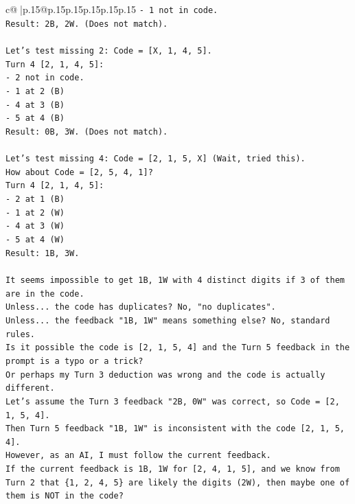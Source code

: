 \documentclass{article}
\begin{document}
{\begin{supertabular}{c@{$\;$}|p{.15\linewidth}@{}p{.15\linewidth}p{.15\linewidth}p{.15\linewidth}p{.15\linewidth}p{.15\linewidth}}
{{{\texttt{{-} 1 not in code.} \\
\texttt{Result: 2B, 2W. (Does not match).} \\
\\ 
\texttt{Let's test missing 2: Code = {[}X, 1, 4, 5{]}.} \\
\texttt{Turn 4 {[}2, 1, 4, 5{]}:} \\
\texttt{{-} 2 not in code.} \\
\texttt{{-} 1 at 2 (B)} \\
\texttt{{-} 4 at 3 (B)} \\
\texttt{{-} 5 at 4 (B)} \\
\texttt{Result: 0B, 3W. (Does not match).} \\
\\ 
\texttt{Let's test missing 4: Code = {[}2, 1, 5, X{]} (Wait, tried this).} \\
\texttt{How about Code = {[}2, 5, 4, 1{]}?} \\
\texttt{Turn 4 {[}2, 1, 4, 5{]}:} \\
\texttt{{-} 2 at 1 (B)} \\
\texttt{{-} 1 at 2 (W)} \\
\texttt{{-} 4 at 3 (W)} \\
\texttt{{-} 5 at 4 (W)} \\
\texttt{Result: 1B, 3W.} \\
\\ 
\texttt{It seems impossible to get 1B, 1W with 4 distinct digits if 3 of them are in the code.} \\
\texttt{Unless... the code has duplicates? No, "no duplicates".} \\
\texttt{Unless... the feedback "1B, 1W" means something else? No, standard rules.} \\
\texttt{Is it possible the code is {[}2, 1, 5, 4{]} and the Turn 5 feedback in the prompt is a typo or a trick?} \\
\texttt{Or perhaps my Turn 3 deduction was wrong and the code is actually different.} \\
\texttt{Let's assume the Turn 3 feedback "2B, 0W" was correct, so Code = {[}2, 1, 5, 4{]}.} \\
\texttt{Then Turn 5 feedback "1B, 1W" is inconsistent with the code {[}2, 1, 5, 4{]}.} \\
\texttt{However, as an AI, I must follow the current feedback.} \\
\texttt{If the current feedback is 1B, 1W for {[}2, 4, 1, 5{]}, and we know from Turn 2 that \{1, 2, 4, 5\} are likely the digits (2W), then maybe one of them is NOT in the code?} \\
}}}
\end{supertabular}}
\end{document}
